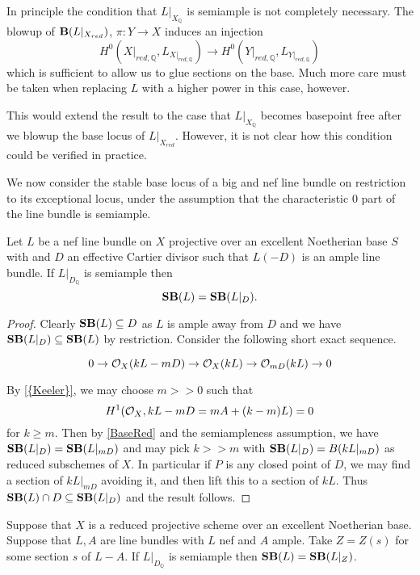 \begin{remark}
	
	In principle the condition that $L|_{X_{\mathbb{Q}}}$ is semiample is not completely necessary. The blowup of $\BB(L|_{X_{red}})$, $\pi: Y \to X$ induces an injection $$H^{0}(X|_{red,\mathbb{Q}},L_{X|_{red,\mathbb{Q}}}) \to H^{0}(Y|_{red,\mathbb{Q}},L_{Y|_{red,\mathbb{Q}}})$$ which is sufficient to allow us to glue sections on the base. Much more care must be taken when replacing $L$ with a higher power in this case, however. 
		
	This would extend the result to the case that $L|_{X_{\mathbb{Q}}}$ becomes basepoint free after we blowup the base locus of $L|_{X_{red}}$. However, it is not clear how this condition could be verified in practice.
	
\end{remark}

We now consider the stable base locus of a big and nef line bundle on restriction to its exceptional locus, under the assumption that the characteristic $0$ part of the line bundle is semiample.

\begin{lemma}
	Let $L$ be a nef line bundle on $X$ projective over an excellent Noetherian base $S$ with and $D$ an effective Cartier divisor such that $L(-D)$ is an ample line bundle. If $L|_{D_{\mathbb{Q}}}$ is semiample then \[\SB(L)=\SB(L|_{D}).\]
\end{lemma}	

\begin{proof}
	Clearly $\SB(L) \subseteq D$ as $L$ is ample away from $D$ and we have $\SB(L|_{D}) \subseteq \SB(L)$ by restriction. Consider the following short exact sequence.
	
	\[0 \to \ox (kL-mD) \to \ox(kL) \to \ox[mD](kL) \to 0\]
	
	By \autoref{{Keeler}}, we may choose $m >>0$ such that $$H^{1}(\ox,kL-mD=mA+(k-m)L)=0$$ for $k \geq m$. Then by \autoref{BaseRed} and the semiampleness assumption, we have $\SB(L|_{D})=\SB(L|_{mD})$ and may pick $k>> m$ with $\SB(L|_{D})=B(kL|_{mD})$ as reduced subschemes of $X$. In particular if $P$ is any closed point of $D$, we may find a section of $kL|_{mD}$ avoiding it, and then lift this to a section of $kL$. Thus $\SB(L)\cap D \subseteq \SB(L|_{D}) $ and the result follows.

\end{proof}


\begin{lemma}
	Suppose that $X$ is a reduced projective scheme over an excellent Noetherian base. Suppose that $L,A$ are line bundles with $L$ nef and $A$ ample. Take $Z=Z(s)$ for some section $s$ of $L-A$. If $L|_{D_{\mathbb{Q}}}$ is semiample then $\SB(L)=\SB(L|_{Z})$.
\end{lemma}

